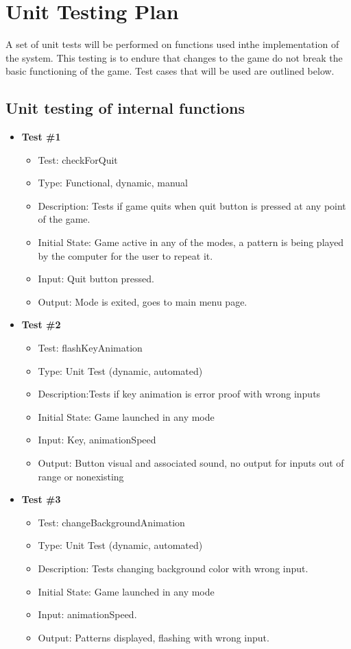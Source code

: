 \documentclass[12pt, titlepage]{article}
\begin{document}
				
\section{Unit Testing Plan}
A set of unit tests will be performed on functions used inthe implementation of the system. This testing is to endure that changes to the game do not break the basic functioning of the game. Test cases that will be used are outlined below.

\subsection{Unit testing of internal functions}

\begin{itemize}
\item \textbf{Test \#1}
\begin{itemize}
\item Test: checkForQuit
\item Type: Functional, dynamic, manual		
\item Description: Tests if game quits when quit button is pressed at any point of the game.	
\item Initial State: Game active in any of the modes, a pattern is being played by the computer for the user to repeat it.
\item Input: Quit button pressed.
\item Output: Mode is exited, goes to main menu page.	
\end{itemize}

\item \textbf{Test \#2}
\begin{itemize}
\item Test: flashKeyAnimation
\item Type: Unit Test (dynamic, automated)			
\item Description:Tests if key animation is error proof with wrong inputs
\item Initial State: Game launched in any mode
\item Input: Key, animationSpeed
\item Output: Button visual and associated sound, no output for inputs out of range or nonexisting		
\end{itemize}

\item \textbf{Test \#3}
\begin{itemize}
\item Test: changeBackgroundAnimation
\item Type: Unit Test (dynamic, automated)			
\item Description: Tests changing background color with wrong input.	
\item Initial State: Game launched in any mode
\item Input: animationSpeed.
\item Output: Patterns displayed, flashing with wrong input.		
\end{itemize}


\end{itemize}
\end{document}
